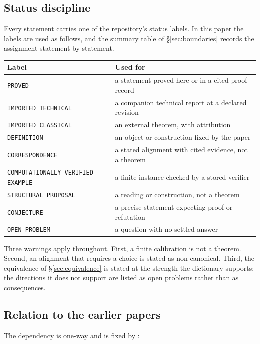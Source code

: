 \subsection{Status discipline}

Every statement carries one of the repository's status labels.  In this paper the
labels are used as follows, and the summary table of
\S\ref{sec:boundaries} records the assignment statement by statement.

\begin{center}
\small
\begin{tabular}{@{}ll@{}}
\toprule
Label & Used for \\
\midrule
\texttt{PROVED} & a statement proved here or in a cited proof record \\
\texttt{IMPORTED TECHNICAL} & a companion technical report at a declared revision \\
\texttt{IMPORTED CLASSICAL} & an external theorem, with attribution \\
\texttt{DEFINITION} & an object or construction fixed by the paper \\
\texttt{CORRESPONDENCE} & a stated alignment with cited evidence, not a theorem \\
\texttt{COMPUTATIONALLY VERIFIED EXAMPLE} & a finite instance checked by a stored verifier \\
\texttt{STRUCTURAL PROPOSAL} & a reading or construction, not a theorem \\
\texttt{CONJECTURE} & a precise statement expecting proof or refutation \\
\texttt{OPEN PROBLEM} & a question with no settled answer \\
\bottomrule
\end{tabular}
\end{center}

Three warnings apply throughout.  First, a finite calibration is not a theorem.
Second, an alignment that requires a choice is stated as non-canonical.  Third, the
equivalence of \S\ref{sec:equivalence} is stated at the strength the dictionary
supports; the directions it does not support are listed as open problems rather than
as consequences.

\subsection{Relation to the earlier papers}

The dependency is one-way and is fixed by
:

